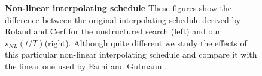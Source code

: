 
\begin{figure}[!ht]
  \centering

  \caption{\textbf{Non-linear interpolating schedule } These figures show the difference between the original interpolating schedule derived by Roland and Cerf for the unstructured search (left) and our $s_{NL}(t/T)$(right). Although quite different we study the effects of this particular non-linear interpolating schedule and compare it with the linear one used by Farhi and Gutmann \cite{Farhi2000}.}
  \label{fig:interpolating_schedule_compared}
\end{figure}
